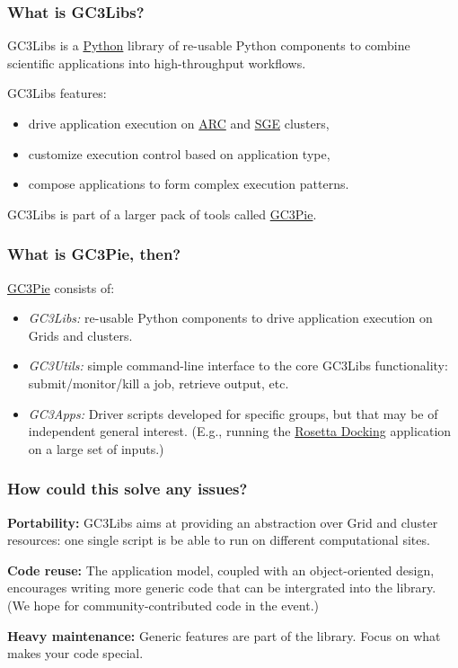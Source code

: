 \documentclass[presentation]{beamer}
\begin{document}
\begin{frame}
  \frametitle{What is GC3Libs?}
  \label{sec:3}
  GC3Libs is a \href{http://www.python.org/}{Python} library of
  re-usable Python components to combine scientific applications into
  high-throughput workflows.

  GC3Libs features:
  \begin{itemize}
  \item drive application execution on
    \href{http://www.nordugrid.org/arc/}{ARC} and
    \href{http://www.oracle.com/us/products/tools/oracle-grid-engine-075549.html}{SGE}
    clusters,
  \item customize execution control based on application type,
  \item compose applications to form complex execution patterns.
  \end{itemize}
  
  GC3Libs is part of a larger pack of tools called \href{http://gc3pie.googlecode.com/}{GC3Pie}.
  \end{frame}

  \begin{frame}
    \frametitle{What is GC3Pie, then?}
    \label{sec:4}

    \href{http://gc3pie.googlecode.com/}{GC3Pie} consists of:
    
    \begin{itemize}
    \item \emph{GC3Libs:} re-usable Python components to drive application
      execution on Grids and clusters.
    \item \emph{GC3Utils:} simple command-line interface to the core GC3Libs
      functionality: submit/monitor/kill a job, retrieve output, etc.
    \item \emph{GC3Apps:} Driver scripts developed for specific groups, but that
      may be of independent general interest.  (E.g., running the
      \href{http://www.rosettacommons.org/manuals/archive/rosetta3.1_user_guide/app_dock.html}{Rosetta Docking} application on a large set of inputs.)
    \end{itemize}
  \end{frame}

  \begin{frame}
    \frametitle{How could this solve any issues?}
    \label{sec:5}

    \textbf{Portability:} GC3Libs aims at providing an abstraction over Grid
    and cluster resources: one single script is be able to run 
    on different computational sites.
    
    \textbf{Code reuse:} The application model, coupled with an object-oriented
    design, encourages writing more generic code that can be intergrated
    into the library.  (We hope for community-contributed code in the
    event.)
    
    \textbf{Heavy maintenance:} Generic features are part of the library. Focus
    on what makes your code special.
  \end{frame}
  
\end{document}
